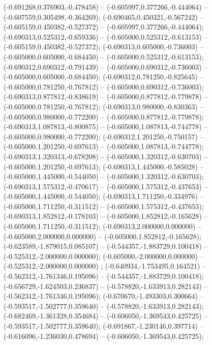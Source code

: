  (-0.691268,0.376903,-0.478458) -- (-0.605997,0.377266,-0.444064) -- (-0.607559,0.305498,-0.364269);
 (-0.690465,0.450321,-0.567242) -- (-0.605159,0.450382,-0.527372) -- (-0.605997,0.377266,-0.444064);
 (-0.690313,0.525312,-0.659336) -- (-0.605000,0.525312,-0.613153) -- (-0.605159,0.450382,-0.527372);
 (-0.690313,0.605000,-0.736003) -- (-0.605000,0.605000,-0.684450) -- (-0.605000,0.525312,-0.613153);
 (-0.690312,0.690312,-0.791439) -- (-0.605000,0.690312,-0.736003) -- (-0.605000,0.605000,-0.684450);
 (-0.690312,0.781250,-0.825645) -- (-0.605000,0.781250,-0.767812) -- (-0.605000,0.690312,-0.736003);
 (-0.690313,0.877812,-0.838619) -- (-0.605000,0.877812,-0.779878) -- (-0.605000,0.781250,-0.767812);
 (-0.690313,0.980000,-0.830363) -- (-0.605000,0.980000,-0.772200) -- (-0.605000,0.877812,-0.779878);
 (-0.690313,1.087813,-0.800875) -- (-0.605000,1.087813,-0.744778) -- (-0.605000,0.980000,-0.772200);
 (-0.690312,1.201250,-0.750157) -- (-0.605000,1.201250,-0.697613) -- (-0.605000,1.087813,-0.744778);
 (-0.690313,1.320313,-0.678208) -- (-0.605000,1.320312,-0.630703) -- (-0.605000,1.201250,-0.697613);
 (-0.690313,1.445000,-0.585028) -- (-0.605000,1.445000,-0.544050) -- (-0.605000,1.320312,-0.630703);
 (-0.690313,1.575312,-0.470617) -- (-0.605000,1.575312,-0.437653) -- (-0.605000,1.445000,-0.544050);
 (-0.690313,1.711250,-0.334976) -- (-0.605000,1.711250,-0.311512) -- (-0.605000,1.575312,-0.437653);
 (-0.690313,1.852812,-0.178103) -- (-0.605000,1.852812,-0.165628) -- (-0.605000,1.711250,-0.311512);
 (-0.690313,2.000000,0.000000) -- (-0.605000,2.000000,0.000000) -- (-0.605000,1.852812,-0.165628);
 (-0.623589,-1.879015,0.085107) -- (-0.544357,-1.883729,0.100418) -- (-0.525312,-2.000000,0.000000);
 (-0.605000,-2.000000,0.000000) -- (-0.525312,-2.000000,0.000000) ;
 (-0.640934,-1.753495,0.164521) -- (-0.562312,-1.761346,0.195096) -- (-0.544357,-1.883729,0.100418);
 (-0.656729,-1.624503,0.236837) -- (-0.578820,-1.633913,0.282143) -- (-0.562312,-1.761346,0.195096);
 (-0.670670,-1.493303,0.300664) -- (-0.593517,-1.502777,0.359640) -- (-0.578820,-1.633913,0.282143);
 (-0.682469,-1.361328,0.354684) -- (-0.606050,-1.369543,0.425725) -- (-0.593517,-1.502777,0.359640);
 (-0.691867,-1.230146,0.397714) -- (-0.616096,-1.236030,0.478694) -- (-0.606050,-1.369543,0.425725);
